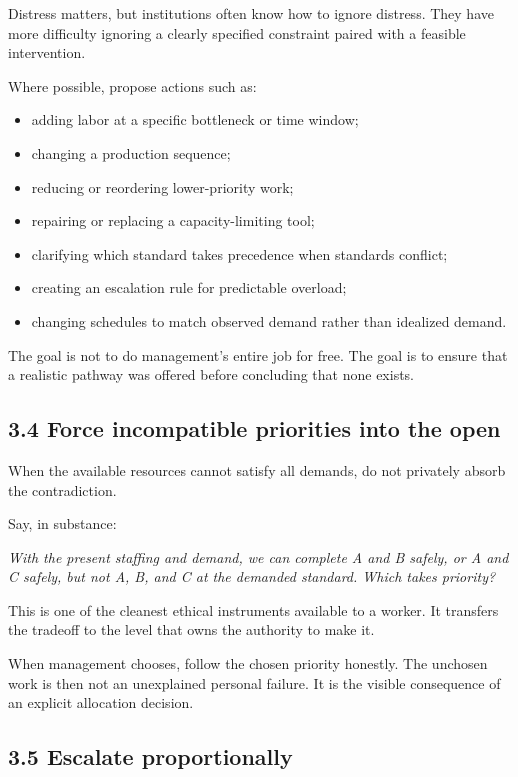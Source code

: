 \documentclass[11pt,oneside]{article}
\providecommand{\tightlist}{%
  \setlength{\itemsep}{0.22em}\setlength{\parskip}{0pt}}
\renewenvironment{quote}
  {\begin{tcolorbox}[
      enhanced,
      breakable,
      colback=ManifestLight,
      colframe=ManifestRule,
      boxrule=0pt,
      leftrule=3pt,
      arc=0pt,
      outer arc=0pt,
      left=10pt,right=10pt,top=8pt,bottom=8pt,
      before skip=0.8em,after skip=0.8em
    ]\itshape}
  {\end{tcolorbox}}
\begin{document}
Distress matters, but institutions often know how to ignore distress. They have more difficulty ignoring a clearly specified constraint paired with a feasible intervention.

Where possible, propose actions such as:

\begin{itemize}
\tightlist
\item
  adding labor at a specific bottleneck or time window;
\item
  changing a production sequence;
\item
  reducing or reordering lower-priority work;
\item
  repairing or replacing a capacity-limiting tool;
\item
  clarifying which standard takes precedence when standards conflict;
\item
  creating an escalation rule for predictable overload;
\item
  changing schedules to match observed demand rather than idealized demand.
\end{itemize}

The goal is not to do management's entire job for free. The goal is to ensure that a realistic pathway was offered before concluding that none exists.

\subsection{3.4 Force incompatible priorities into the open}\label{force-incompatible-priorities-into-the-open}

When the available resources cannot satisfy all demands, do not privately absorb the contradiction.

Say, in substance:

\begin{quote}
With the present staffing and demand, we can complete A and B safely, or A and C safely, but not A, B, and C at the demanded standard. Which takes priority?
\end{quote}

This is one of the cleanest ethical instruments available to a worker. It transfers the tradeoff to the level that owns the authority to make it.

When management chooses, follow the chosen priority honestly. The unchosen work is then not an unexplained personal failure. It is the visible consequence of an explicit allocation decision.

\subsection{3.5 Escalate proportionally}\label{escalate-proportionally}
\end{document}
